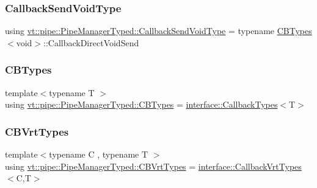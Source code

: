 \subsubsection{\texorpdfstring{Callback\+Send\+Void\+Type}{CallbackSendVoidType}}
{\footnotesize\ttfamily using \hyperlink{structvt_1_1pipe_1_1_pipe_manager_typed_a09eb51f50878116c3b0867fad5f9aab0}{vt\+::pipe\+::\+Pipe\+Manager\+Typed\+::\+Callback\+Send\+Void\+Type} =  typename \hyperlink{structvt_1_1pipe_1_1_pipe_manager_typed_a62dfc4fabe734915f3ec2544e225b6b3}{C\+B\+Types}$<$void$>$\+::Callback\+Direct\+Void\+Send}

\mbox{\label{structvt_1_1pipe_1_1_pipe_manager_typed_a62dfc4fabe734915f3ec2544e225b6b3}} 
\subsubsection{\texorpdfstring{C\+B\+Types}{CBTypes}}
{\footnotesize\ttfamily template$<$typename T $>$ \\
using \hyperlink{structvt_1_1pipe_1_1_pipe_manager_typed_a62dfc4fabe734915f3ec2544e225b6b3}{vt\+::pipe\+::\+Pipe\+Manager\+Typed\+::\+C\+B\+Types} =  \hyperlink{structvt_1_1pipe_1_1interface_1_1_callback_types}{interface\+::\+Callback\+Types}$<$T$>$}

\mbox{\label{structvt_1_1pipe_1_1_pipe_manager_typed_abb75b2bfdb23ebfa7f4f677a7f4bcb77}} 
\subsubsection{\texorpdfstring{C\+B\+Vrt\+Types}{CBVrtTypes}}
{\footnotesize\ttfamily template$<$typename C , typename T $>$ \\
using \hyperlink{structvt_1_1pipe_1_1_pipe_manager_typed_abb75b2bfdb23ebfa7f4f677a7f4bcb77}{vt\+::pipe\+::\+Pipe\+Manager\+Typed\+::\+C\+B\+Vrt\+Types} =  \hyperlink{structvt_1_1pipe_1_1interface_1_1_callback_vrt_types}{interface\+::\+Callback\+Vrt\+Types}$<$C,T$>$}



